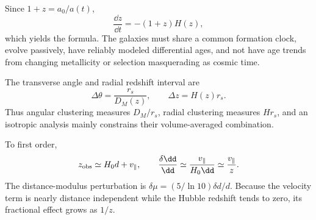 \begin{solution}
Since \(1+z=a_0/a(t)\),
\[
\frac{\dd z}{\dd t}=-(1+z)H(z),
\]
which yields the formula.  The galaxies must share a common formation clock,
evolve passively, have reliably modeled differential ages, and not have age
trends from changing metallicity or selection masquerading as cosmic time.
\end{solution}

\begin{solution}
The transverse angle and radial redshift interval are
\[
\Delta\theta=\frac{r_s}{D_M(z)},\qquad
\Delta z=H(z)r_s.
\]
Thus angular clustering measures \(D_M/r_s\), radial clustering measures
\(Hr_s\), and an isotropic analysis mainly constrains their volume-averaged
combination.
\end{solution}

\begin{solution}
To first order,
\[
z_{\rm obs}\simeq H_0d+v_\parallel,
\qquad
\frac{\delta \dd}{\dd}\simeq\frac{v_\parallel}{H_0\dd}
\simeq\frac{v_\parallel}{z}.
\]
The distance-modulus perturbation is
\(\delta\mu=(5/\ln10)\delta d/d\).  Because the velocity term is nearly
distance independent while the Hubble redshift tends to zero, its fractional
effect grows as \(1/z\).
\end{solution}
